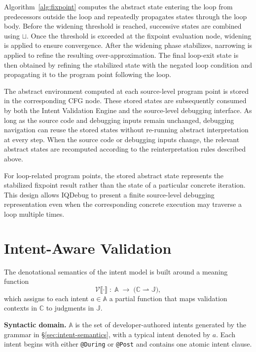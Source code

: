 \documentclass[11pt,oneside]{report}
\theoremstyle{plain}
\theoremstyle{definition}
\theoremstyle{remark}
\begin{document}
Algorithm~\ref{alg:fixpoint} computes the abstract state entering the loop from predecessors outside the loop and repeatedly propagates states through the loop body.
Before the widening threshold is reached, successive states are combined using \(\sqcup\).
Once the threshold is exceeded at the fixpoint evaluation node, widening is applied to ensure convergence.
After the widening phase stabilizes, narrowing is applied to refine the resulting over-approximation.
The final loop-exit state is then obtained by refining the stabilized state with the negated loop condition and propagating it to the program point following the loop.

The abstract environment computed at each source-level program point is stored in the corresponding CFG node.
These stored states are subsequently consumed by both the Intent Validation Engine and the source-level debugging interface.
As long as the source code and debugging inputs remain unchanged, debugging navigation can reuse the stored states without re-running abstract interpretation at every step.
When the source code or debugging inputs change, the relevant abstract states are recomputed according to the reinterpretation rules described above.

For loop-related program points, the stored abstract state represents the stabilized fixpoint result rather than the state of a particular concrete iteration.
This design allows IQDebug to present a finite source-level debugging representation even when the corresponding concrete execution may traverse a loop multiple times.

\section{Intent-Aware Validation}\label{sec:design:intent}

The denotational semantics of the intent model is built around a meaning function
\[
\mathcal{V}\llbracket \cdot \rrbracket
\;\colon\;
\mathbb{A}
\;\to\;
\bigl(\mathbb{C} \rightharpoonup \mathbb{J}\bigr),
\]
which assigns to each intent \(a \in \mathbb{A}\) a partial function that maps validation contexts in \(\mathbb{C}\) to judgments in \(\mathbb{J}\).

\smallskip
\noindent\textbf{Syntactic domain.}
$\mathbb{A}$ is the set of developer-authored intents generated by the grammar in
\S\ref{sec:intent-semantics}, with a typical intent denoted by $a$.
Each intent begins with either \texttt{@During} or \texttt{@Post} and
contains one atomic intent clause.
\end{document}
